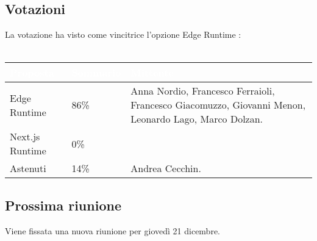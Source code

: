 \subsection{Votazioni} \label{subsec:resvotazione}
     La votazione ha visto come vincitrice l'opzione Edge Runtime : \\\\
        \begingroup
            \setlength{\tabcolsep}{10pt}
            \renewcommand{\arraystretch}{1.5}
            \begin{tabularx}{0.93\textwidth}{| l | l | X |}
                 \hline
                 \rowcolor{headerrow}\textbf{\textcolor{white}{Proposta}} & \textbf{\textcolor{white}{Sommario}} & \textbf{\textcolor{white}{Mittente}} \\
                 \hline
                 Edge Runtime & 86\%  & Anna Nordio, Francesco Ferraioli, Francesco Giacomuzzo, Giovanni Menon, Leonardo Lago, Marco Dolzan. \\
                 \hline
                 Next.js Runtime & 0\% &  \\
                 \hline
                 Astenuti & 14\% & Andrea Cecchin. \\
                 \hline
            \end{tabularx}
        \endgroup



\subsection{Prossima riunione} \label{subsec:riunione}
Viene fissata una nuova riunione per giovedì 21 dicembre.